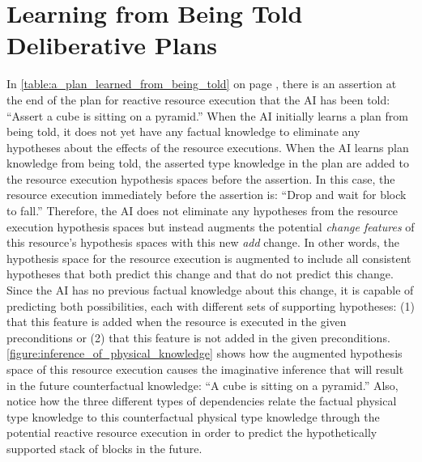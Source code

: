 \section{Learning from Being Told Deliberative Plans}

In {\mbox{\autoref{table:a_plan_learned_from_being_told}}} on page
{\mbox{\pageref{table:a_plan_learned_from_being_told}}}, there is an
assertion at the end of the plan for reactive resource execution that
the AI has been told: ``Assert a cube is sitting on a pyramid.''  When
the AI initially learns a plan from being told, it does not yet have
any factual knowledge to eliminate any hypotheses about the effects of
the resource executions.  When the AI learns plan knowledge from being
told, the asserted type knowledge in the plan are added to the
resource execution hypothesis spaces before the assertion.  In this
case, the resource execution immediately before the assertion is:
``Drop and wait for block to fall.''  Therefore, the AI does not
eliminate any hypotheses from the resource execution hypothesis spaces
but instead augments the potential \emph{change features} of this
resource's hypothesis spaces with this new \emph{add} change.  In
other words, the hypothesis space for the resource execution is
augmented to include all consistent hypotheses that both predict this
change and that do not predict this change.  Since the AI has no
previous factual knowledge about this change, it is capable of
predicting both possibilities, each with different sets of supporting
hypotheses: (1) that this feature is added when the resource is
executed in the given preconditions or (2) that this feature is not
added in the given preconditions.
{\mbox{\autoref{figure:inference_of_physical_knowledge}}} shows how
the augmented hypothesis space of this resource execution causes the
imaginative inference that will result in the future counterfactual
knowledge: ``A cube is sitting on a pyramid.''  Also, notice how the
three different types of dependencies relate the factual physical type
knowledge to this counterfactual physical type knowledge through the
potential reactive resource execution in order to predict the
hypothetically supported stack of blocks in the future.
